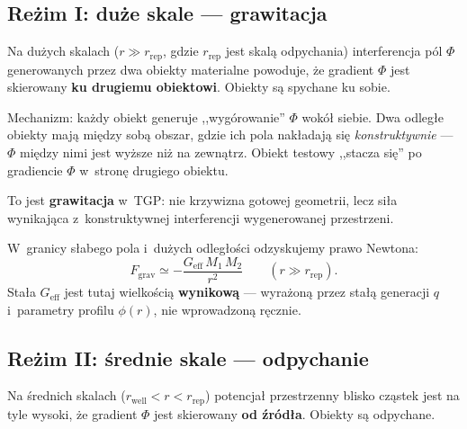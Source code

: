 \subsection{Re\.zim I: du\.ze skale --- grawitacja}\label{ssec:grawitacja}

\begin{proposition}\label{prop:grav}
Na du\.zych skalach ($r \gg r_{\mathrm{rep}}$, gdzie $r_{\mathrm{rep}}$
jest skal\k{a} odpychania) interferencja p\'ol $\Phi$ generowanych
przez dwa obiekty materialne powoduje, \.ze gradient $\Phi$
jest skierowany \textbf{ku drugiemu obiektowi}. Obiekty s\k{a}
spychane ku sobie.
\end{proposition}

Mechanizm: ka\.zdy obiekt generuje ,,wyg\'orowanie'' $\Phi$ wok\'o\l{}
siebie. Dwa odleg\l{}e obiekty maj\k{a} mi\k{e}dzy sob\k{a} obszar, gdzie
ich pola nak\l{}adaj\k{a} si\k{e} \emph{konstruktywnie} --- $\Phi$
mi\k{e}dzy nimi jest wy\.zsze ni\.z na zewn\k{a}trz. Obiekt testowy
,,stacza si\k{e}'' po gradiencie $\Phi$ w~stron\k{e} drugiego obiektu.

To jest \textbf{grawitacja} w~TGP: nie krzywizna gotowej geometrii,
lecz si\l{}a wynikaj\k{a}ca z~konstruktywnej interferencji
wygenerowanej przestrzeni.

W~granicy s\l{}abego pola i~du\.zych odleg\l{}o\'sci odzyskujemy
prawo Newtona:
\begin{equation}\label{eq:newton-limit}
    F_{\mathrm{grav}} \simeq -\frac{G_{\mathrm{eff}}\,M_1\,M_2}{r^2}
    \qquad (r \gg r_{\mathrm{rep}}).
\end{equation}
Sta\l{}a $G_{\mathrm{eff}}$ jest tutaj wielko\'sci\k{a} \textbf{wynikow\k{a}}
--- wyra\.zon\k{a} przez sta\l{}\k{a} generacji $q$ i~parametry profilu
$\phi(r)$, nie wprowadzon\k{a} r\k{e}cznie.

\subsection{Re\.zim II: \'srednie skale --- odpychanie}\label{ssec:odpychanie}

\begin{proposition}\label{prop:rep}
Na \'srednich skalach ($r_{\mathrm{well}} < r < r_{\mathrm{rep}}$)
potencja\l{} przestrzenny blisko cz\k{a}stek jest na tyle wysoki,
\.ze gradient $\Phi$ jest skierowany \textbf{od \'zr\'od\l{}a}.
Obiekty s\k{a} odpychane.
\end{proposition}

